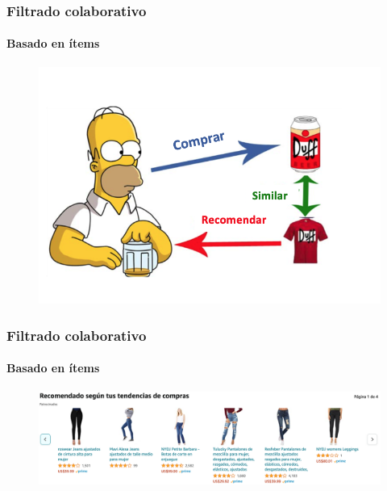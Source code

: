 \documentclass[
  shownotes,
  xcolor={svgnames},
  hyperref={colorlinks,citecolor=DarkBlue,linkcolor=Black,urlcolor=DarkBlue}
  , aspectratio=169]{beamer}
\begin{document}
\begin{frame}
\frametitle{Filtrado colaborativo}
\framesubtitle{Basado en ítems}

\begin{figure}[H]
\centering

  \includegraphics[scale=0.6]{../figs/Homero.png}
\end{figure}


\end{frame}    

\begin{frame}
\frametitle{Filtrado colaborativo}
\framesubtitle{Basado en ítems}

\begin{figure}[H]
\centering

  \includegraphics[scale=0.6]{../figs/item_jeans.png}
\end{figure}



\end{frame}    
\end{document}

